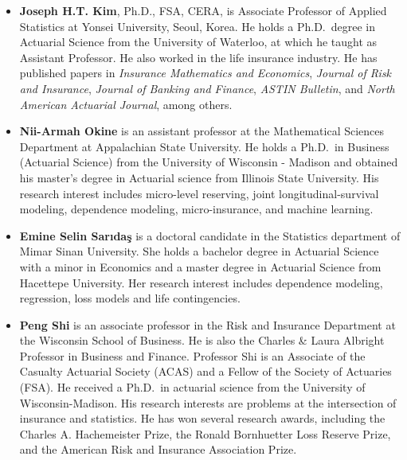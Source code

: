 \documentclass[
]{book}
\providecommand{\tightlist}{%
  \setlength{\itemsep}{0pt}\setlength{\parskip}{0pt}}
\begin{document}
\begin{itemize}
\tightlist
\item
  \textbf{Joseph H.T. Kim}, Ph.D., FSA, CERA, is Associate Professor of Applied Statistics at Yonsei University, Seoul, Korea. He holds a Ph.D.~degree in Actuarial Science from the University of Waterloo, at which he taught as Assistant Professor. He also worked in the life insurance industry. He has published papers in \emph{Insurance Mathematics and Economics}, \emph{Journal of Risk and Insurance}, \emph{Journal of Banking and Finance}, \emph{ASTIN Bulletin}, and \emph{North American Actuarial Journal}, among others.
\end{itemize}

\begin{itemize}
\tightlist
\item
  \textbf{Nii-Armah Okine} is an assistant professor at the Mathematical Sciences Department at Appalachian State University. He holds a Ph.D.~in Business (Actuarial Science) from the University of Wisconsin - Madison and obtained his master's degree in Actuarial science from Illinois State University. His research interest includes micro-level reserving, joint longitudinal-survival modeling, dependence modeling, micro-insurance, and machine learning.
\end{itemize}

\begin{itemize}
\tightlist
\item
  \textbf{Emine Selin Sarıdaş} is a doctoral candidate in the Statistics department of Mimar Sinan University. She holds a bachelor degree in Actuarial Science with a minor in Economics and a master degree in Actuarial Science from Hacettepe University. Her research interest includes dependence modeling, regression, loss models and life contingencies.
\end{itemize}

\begin{itemize}
\tightlist
\item
  \textbf{Peng Shi} is an associate professor in the Risk and Insurance Department at the Wisconsin School of Business. He is also the Charles \& Laura Albright Professor in Business and Finance. Professor Shi is an Associate of the Casualty Actuarial Society (ACAS) and a Fellow of the Society of Actuaries (FSA). He received a Ph.D.~in actuarial science from the University of Wisconsin-Madison. His research interests are problems at the intersection of insurance and statistics. He has won several research awards, including the Charles A. Hachemeister Prize, the Ronald Bornhuetter Loss Reserve Prize, and the American Risk and Insurance Association Prize.
\end{itemize}
\end{document}
